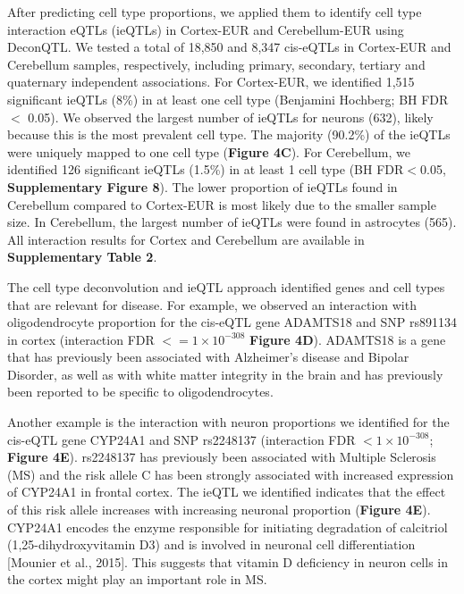 After predicting cell type proportions, we applied them to identify cell type interaction eQTLs (ieQTLs) in Cortex-EUR and Cerebellum-EUR using DeconQTL\cite{raulaguirregamboaDeconvolutionBulkBlood2020}. We tested a total of 18,850 and 8,347 cis-eQTLs in Cortex-EUR and Cerebellum samples, respectively, including primary, secondary, tertiary and quaternary independent associations. For Cortex-EUR, we identified 1,515 significant ieQTLs (8\%) in at least one cell type (Benjamini Hochberg; BH FDR $<$ 0.05). We observed the largest number of ieQTLs for neurons (632), likely because this is the most prevalent cell type. The majority (90.2\%) of the ieQTLs were uniquely mapped to one cell type (\textbf{Figure 4C}).  For Cerebellum, we identified 126 significant ieQTLs (1.5\%) in at least 1 cell type (BH FDR$<$0.05, \textbf{Supplementary Figure 8}). The lower proportion of ieQTLs found in Cerebellum compared to Cortex-EUR is most likely due to the smaller sample size. In Cerebellum, the largest number of ieQTLs were found in astrocytes (565). All interaction results for Cortex and Cerebellum are available in \textbf{Supplementary Table 2}. 

The cell type deconvolution and ieQTL approach identified genes and cell types that are relevant for disease. For example, we observed an interaction with oligodendrocyte proportion for the cis-eQTL gene ADAMTS18 and SNP rs891134 in cortex (interaction FDR $<= 1 \times 10^{-308}$ \textbf{Figure 4D}). ADAMTS18 is a gene that has previously been associated with Alzheimer’s disease and Bipolar Disorder, as well as with white matter integrity in the brain\cite{lopezGenomewideSearchGenetic2012} and has previously been reported to be specific to oligodendrocytes\cite{grubmanSinglecellAtlasEntorhinal2019}.  

Another example is the interaction with neuron proportions we identified for the cis-eQTL gene CYP24A1 and SNP rs2248137 (interaction FDR $< 1 \times 10^{-308}$; \textbf{Figure 4E}). rs2248137 has previously been associated with Multiple Sclerosis (MS)\cite{consortium*+MultipleSclerosisGenomic2019} and the risk allele C has been strongly associated with increased expression of CYP24A1 in frontal cortex\cite{ramasamyGeneticEvidencePathogenic2014}. The ieQTL we identified indicates that the effect of this risk allele increases with increasing neuronal proportion (\textbf{Figure 4E}). CYP24A1 encodes the enzyme responsible for initiating degradation of calcitriol (1,25-dihydroxyvitamin D3) and is involved in neuronal cell differentiation [Mounier et al., 2015]. This suggests that vitamin D deficiency in neuron cells in the cortex might play an important role in MS.  


